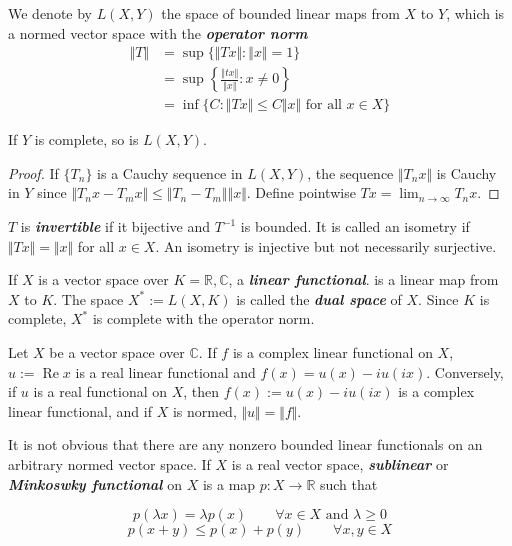 \documentclass{article}
\theoremstyle{definition}
\newcommand{\R}{\mathbb{R}}
\newcommand{\C}{\mathbb{C}}
\begin{document}
We denote by $L(X,Y)$ the space of bounded linear maps from $X$ to $Y$, which is a normed vector space with the \textbf{\textit{operator norm}}
\begin{align*}
	\Vert T\Vert&=\sup\{\Vert Tx\Vert:\Vert x\Vert=1\}\\
	&=\sup\left\{\frac{\Vert tx\Vert}{\Vert x\Vert}:x\neq0\right\}\\
	&=\inf\{C:\Vert Tx\Vert\leq C\Vert x\Vert \text{ for all }x\in X\}
\end{align*}
\begin{prop}
	If $Y$ is complete, so is $L(X,Y)$.
\end{prop}
\begin{proof}
	If $\{T_n\}$ is a Cauchy sequence in $L(X,Y)$, the sequence $\Vert T_nx\Vert$ is Cauchy in $Y$ since $\Vert T_nx-T_mx\Vert\leq\Vert T_n-T_m\Vert\Vert x\Vert$. Define pointwise $Tx=\lim_{n\to\infty}T_nx$.
\end{proof}
$T$ is \textbf{\textit{invertible}} if it bijective and $T^{-1}$ is bounded. It is called an isometry if $\Vert Tx\Vert=\Vert x\Vert$ for all $x\in X$. An isometry is injective but not necessarily surjective.

If $X$ is a vector space over $K=\R,\C$, a \textbf{\textit{linear functional}}. is a linear map from $X$ to $K$. The space $X^*:=L(X,K)$ is called the \textbf{\textit{dual space}} of $X$. Since $K$ is complete, $X^*$ is complete with the operator norm.

\begin{prop}
	Let $X$ be a vector space over $\C$. If $f$ is a complex linear functional on $X$,
	$u:=\operatorname{Re}x$ is a real linear functional and $f(x)=u(x)-iu(ix)$.
	Conversely, if $u$ is a real functional on $X$, then $f(x):=u(x)-iu(ix)$ is a complex linear functional, and if $X$ is normed, $\Vert u\Vert=\Vert f\Vert$.
\end{prop}

It is not obvious that there are any nonzero bounded linear functionals on an arbitrary normed vector space. If $X$ is a real vector space, \textbf{\textit{sublinear}} or \textbf{\textit{Minkoswky functional}} on $X$ is a map $p:X\to\R$ such that

\begin{equation}\label{eq:sublinear1}
		p(\lambda x)=\lambda p(x)\qquad\forall x\in X\text{ and }\lambda\geq0
\end{equation}
\begin{equation}\label{eq:sublinear2}
	p(x+y)\leq p(x)+p(y)\qquad\forall x,y\in X
\end{equation}
\end{document}
